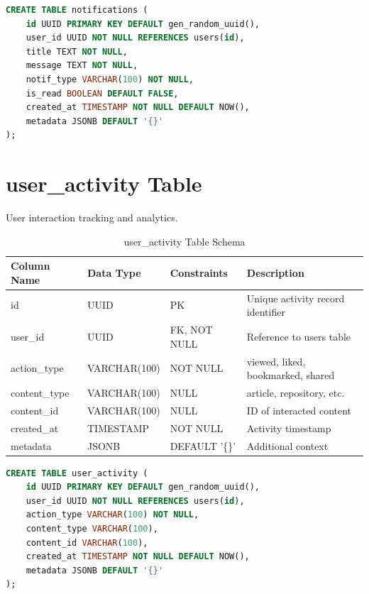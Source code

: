 \documentclass[12pt,a4paper]{report}
\begin{document}
\begin{lstlisting}[language=SQL,basicstyle=\ttfamily\small]
CREATE TABLE notifications (
    id UUID PRIMARY KEY DEFAULT gen_random_uuid(),
    user_id UUID NOT NULL REFERENCES users(id),
    title TEXT NOT NULL,
    message TEXT NOT NULL,
    notif_type VARCHAR(100) NOT NULL,
    is_read BOOLEAN DEFAULT FALSE,
    created_at TIMESTAMP NOT NULL DEFAULT NOW(),
    metadata JSONB DEFAULT '{}'
);
\end{lstlisting}

\newpage
\section{user\_activity Table}

User interaction tracking and analytics.

\begin{table}[h]
\centering
\small
\caption{user\_activity Table Schema}
\begin{tabular}{|l|l|l|l|}
\toprule
\textbf{Column Name} & \textbf{Data Type} & \textbf{Constraints} & \textbf{Description} \\
\midrule
id & UUID & PK & Unique activity record identifier \\
user\_id & UUID & FK, NOT NULL & Reference to users table \\
action\_type & VARCHAR(100) & NOT NULL & viewed, liked, bookmarked, shared \\
content\_type & VARCHAR(100) & NULL & article, repository, etc. \\
content\_id & VARCHAR(100) & NULL & ID of interacted content \\
created\_at & TIMESTAMP & NOT NULL & Activity timestamp \\
metadata & JSONB & DEFAULT '\{\}' & Additional context \\
\bottomrule
\end{tabular}
\end{table}

\begin{lstlisting}[language=SQL,basicstyle=\ttfamily\small]
CREATE TABLE user_activity (
    id UUID PRIMARY KEY DEFAULT gen_random_uuid(),
    user_id UUID NOT NULL REFERENCES users(id),
    action_type VARCHAR(100) NOT NULL,
    content_type VARCHAR(100),
    content_id VARCHAR(100),
    created_at TIMESTAMP NOT NULL DEFAULT NOW(),
    metadata JSONB DEFAULT '{}'
);
\end{lstlisting}

\newpage
\end{document}
